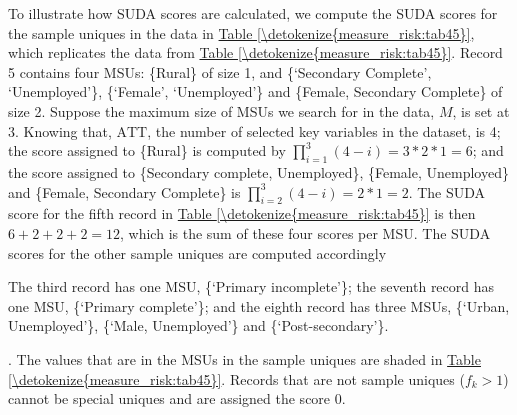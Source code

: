 \documentclass[letterpaper,10pt,english]{sphinxmanual}
\begin{document}
To illustrate how SUDA scores are calculated, we compute the SUDA scores
for the sample uniques in the data in \hyperref[\detokenize{measure_risk:tab45}]{Table \ref{\detokenize{measure_risk:tab45}}}, which replicates the
data from \hyperref[\detokenize{measure_risk:tab45}]{Table \ref{\detokenize{measure_risk:tab45}}}. Record 5 contains four MSUs: \{Rural\} of size 1, and
\{‘Secondary Complete’, ‘Unemployed’\}, \{‘Female’, ‘Unemployed’\} and
\{Female, Secondary Complete\} of size 2. Suppose the maximum size of MSUs
we search for in the data, \(M\), is set at 3. Knowing that,
\(\text{ATT}\), the number of selected key variables in the dataset,
is 4; the score assigned to \{Rural\} is computed by
\(\prod_{i = 1}^{3}{(4 - i)} = 3*2*1 = 6\); and the score assigned
to \{Secondary complete, Unemployed\}, \{Female, Unemployed\} and \{Female,
Secondary Complete\} is
\(\prod_{i = 2}^{3}\left( 4 - i \right) = 2*1 = 2\). The SUDA score
for the fifth record in \hyperref[\detokenize{measure_risk:tab45}]{Table \ref{\detokenize{measure_risk:tab45}}} is then \(6 + 2 + 2 + 2 = 12\),
which is the sum of these four scores per MSU. The SUDA scores for the
other sample uniques are computed accordingly %
\begin{footnote}[13]\sphinxAtStartFootnote
The third record has one MSU, \{‘Primary incomplete’\}; the seventh
record has one MSU, \{‘Primary complete’\}; and the eighth record has
three MSUs, \{‘Urban, Unemployed’\}, \{‘Male, Unemployed’\} and
\{‘Post-secondary’\}.
%
\end{footnote}. The
values that are in the MSUs in the sample uniques are shaded in \hyperref[\detokenize{measure_risk:tab45}]{Table \ref{\detokenize{measure_risk:tab45}}}.
Records that are not sample uniques (\(f_{k} > 1\)) cannot be
special uniques and are assigned the score 0.
\end{document}
